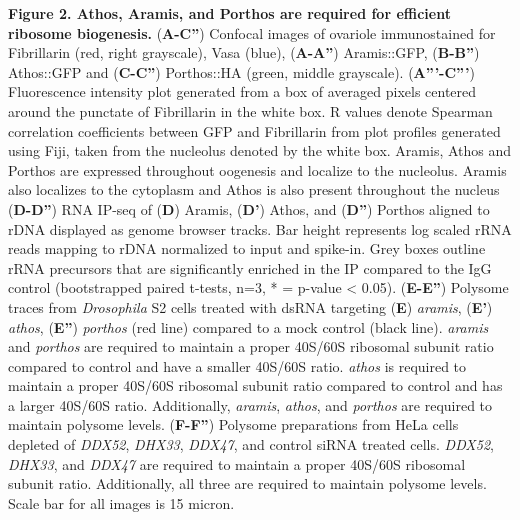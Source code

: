 \documentclass[12pt,twoside]{reedthesis}
\begin{document}
\textbf{Figure 2. Athos, Aramis, and Porthos are required for efficient
ribosome biogenesis.} (\textbf{A-C''}) Confocal images of ovariole
immunostained for Fibrillarin (red, right grayscale), Vasa (blue),
(\textbf{A-A''}) Aramis::GFP, (\textbf{B-B''}) Athos::GFP and (\textbf{C-C''})
Porthos::HA (green, middle grayscale). (\textbf{A'''-C'''}) Fluorescence
intensity plot generated from a box of averaged pixels centered around
the punctate of Fibrillarin in the white box. R values denote Spearman
correlation coefficients between GFP and Fibrillarin from plot profiles
generated using Fiji, taken from the nucleolus denoted by the white box.
Aramis, Athos and Porthos are expressed throughout oogenesis and
localize to the nucleolus. Aramis also localizes to the cytoplasm and
Athos is also present throughout the nucleus (\textbf{D-D''}) RNA IP-seq of
(\textbf{D}) Aramis, (\textbf{D'}) Athos, and (\textbf{D''}) Porthos aligned to rDNA
displayed as genome browser tracks. Bar height represents log scaled
rRNA reads mapping to rDNA normalized to input and spike-in. Grey boxes
outline rRNA precursors that are significantly enriched in the IP
compared to the IgG control (bootstrapped paired t-tests, n=3, * =
p-value \textless{} 0.05). (\textbf{E-E''}) Polysome traces from \emph{Drosophila} S2 cells
treated with dsRNA targeting (\textbf{E}) \emph{aramis}, (\textbf{E'}) \emph{athos},
(\textbf{E''}) \emph{porthos} (red line) compared to a mock control (black line).
\emph{aramis} and \emph{porthos} are required to maintain a proper 40S/60S
ribosomal subunit ratio compared to control and have a smaller 40S/60S
ratio. \emph{athos} is required to maintain a proper 40S/60S ribosomal
subunit ratio compared to control and has a larger 40S/60S ratio.
Additionally, \emph{aramis}, \emph{athos}, and \emph{porthos} are required to maintain
polysome levels. (\textbf{F-F''}) Polysome preparations from HeLa cells
depleted of \emph{DDX52}, \emph{DHX33}, \emph{DDX47}, and control siRNA treated cells.
\emph{DDX52}, \emph{DHX33}, and \emph{DDX47} are required to maintain a proper 40S/60S
ribosomal subunit ratio. Additionally, all three are required to
maintain polysome levels. Scale bar for all images is 15 micron.
\end{document}
